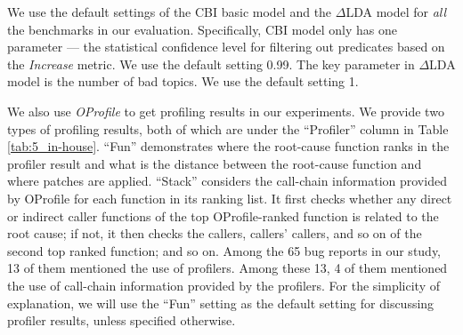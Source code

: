 We use the default settings of the CBI basic model and the 
$\Delta$LDA model for \textit{all} the benchmarks in our evaluation.
Specifically, CBI model only has one parameter --- the statistical
confidence level for filtering out predicates based on the \textit{Increase}
metric. We use the default setting 0.99. The key parameter
in $\Delta$LDA model is the number of bad topics. We use the default setting
1.

We also use \textit{OProfile} \citep{oprofile} to get profiling results in our 
experiments.
We provide two types of profiling results, both of which are under the
``Profiler'' column in Table \ref{tab:5_in-house}.
``Fun'' demonstrates where the root-cause function ranks in the profiler 
result and what is the distance between 
the root-cause function and where patches are applied. 
``Stack'' considers the call-chain information provided by OProfile for each function
in its ranking list. It first checks whether any direct or indirect caller functions
of the top OProfile-ranked function is related to the root
cause; if not, it then checks the callers, callers' callers, and so on
of the second top ranked function;
and so on.
Among the 65 bug reports in our study, 13 of them mentioned the use of 
profilers. Among these 13, 4 of them mentioned the use of call-chain information
provided by the profilers.
For the simplicity of explanation, we will use the ``Fun'' setting as the
default setting for discussing profiler results,
unless specified otherwise.


